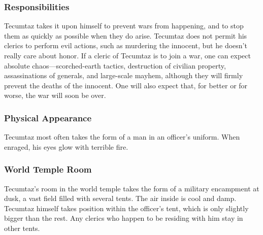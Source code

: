 \subsubsection*{Responsibilities}
Tecumtaz takes it upon himself to prevent wars from happening, and to stop them as quickly as possible when they do arise.
Tecumtaz does not permit his clerics to perform evil actions, such as murdering the innocent, but he doesn't really care about honor.
If a cleric of Tecumtaz is to join a war, one can expect absolute chaos---scorched-earth tactics, destruction of civilian property, assassinations of generals, and large-scale mayhem, although they will firmly prevent the deaths of the innocent.
One will also expect that, for better or for worse, the war will soon be over.

\subsubsection*{Physical Appearance} 
Tecumtaz most often takes the form of a man in an officer's uniform.
When enraged, his eyes glow with terrible fire.

\subsubsection*{World Temple Room}
Tecumtaz's room in the world temple takes the form of a military encampment at dusk, a vast field filled with several tents.
The air inside is cool and damp.
Tecumtaz himself takes position within the officer's tent, which is only slightly bigger than the rest.
Any clerics who happen to be residing with him stay in other tents.
